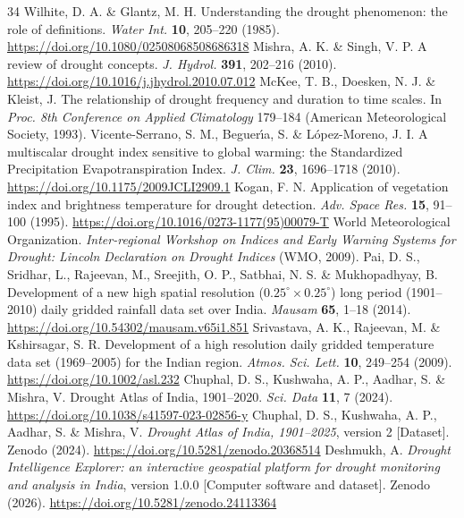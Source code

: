 \documentclass[11pt,a4paper]{article}
\begin{document}
\begin{thebibliography}{34}
\small
{} Wilhite, D. A. \& Glantz, M. H. Understanding the drought phenomenon: the role of definitions. \textit{Water Int.} \textbf{10}, 205--220 (1985). \url{https://doi.org/10.1080/02508068508686318}
 Mishra, A. K. \& Singh, V. P. A review of drought concepts. \textit{J. Hydrol.} \textbf{391}, 202--216 (2010). \url{https://doi.org/10.1016/j.jhydrol.2010.07.012}
 McKee, T. B., Doesken, N. J. \& Kleist, J. The relationship of drought frequency and duration to time scales. In \textit{Proc. 8th Conference on Applied Climatology} 179--184 (American Meteorological Society, 1993).
 Vicente-Serrano, S. M., Beguer\'{\i}a, S. \& L\'{o}pez-Moreno, J. I. A multiscalar drought index sensitive to global warming: the Standardized Precipitation Evapotranspiration Index. \textit{J. Clim.} \textbf{23}, 1696--1718 (2010). \url{https://doi.org/10.1175/2009JCLI2909.1}
 Kogan, F. N. Application of vegetation index and brightness temperature for drought detection. \textit{Adv. Space Res.} \textbf{15}, 91--100 (1995). \url{https://doi.org/10.1016/0273-1177(95)00079-T}
 World Meteorological Organization. \textit{Inter-regional Workshop on Indices and Early Warning Systems for Drought: Lincoln Declaration on Drought Indices} (WMO, 2009).
 Pai, D. S., Sridhar, L., Rajeevan, M., Sreejith, O. P., Satbhai, N. S. \& Mukhopadhyay, B. Development of a new high spatial resolution ($0.25^\circ\times0.25^\circ$) long period (1901--2010) daily gridded rainfall data set over India. \textit{Mausam} \textbf{65}, 1--18 (2014). \url{https://doi.org/10.54302/mausam.v65i1.851}
 Srivastava, A. K., Rajeevan, M. \& Kshirsagar, S. R. Development of a high resolution daily gridded temperature data set (1969--2005) for the Indian region. \textit{Atmos. Sci. Lett.} \textbf{10}, 249--254 (2009). \url{https://doi.org/10.1002/asl.232}
 Chuphal, D. S., Kushwaha, A. P., Aadhar, S. \& Mishra, V. Drought Atlas of India, 1901--2020. \textit{Sci. Data} \textbf{11}, 7 (2024). \url{https://doi.org/10.1038/s41597-023-02856-y}
 Chuphal, D. S., Kushwaha, A. P., Aadhar, S. \& Mishra, V. \textit{Drought Atlas of India, 1901--2025}, version 2 [Dataset]. Zenodo (2024). \url{https://doi.org/10.5281/zenodo.20368514}
 Deshmukh, A. \textit{Drought Intelligence Explorer: an interactive geospatial platform for drought monitoring and analysis in India}, version 1.0.0 [Computer software and dataset]. Zenodo (2026). \url{https://doi.org/10.5281/zenodo.24113364}

\end{thebibliography}
\end{document}
